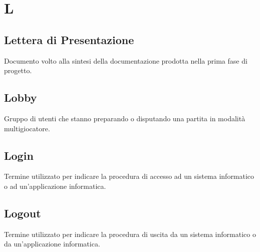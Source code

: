 \section{L}
	\subsection{Lettera di Presentazione}
		Documento volto alla sintesi della documentazione prodotta nella prima fase di progetto.
    \subsection{Lobby}
        Gruppo di utenti che stanno preparando o disputando una partita in modalità multigiocatore.
	\subsection{Login}
		Termine utilizzato per indicare la procedura di accesso ad un sistema informatico o ad un'applicazione informatica.
    \subsection{Logout}
        Termine utilizzato per indicare la procedura di uscita da un sistema informatico o da un'applicazione informatica.		
\newpage